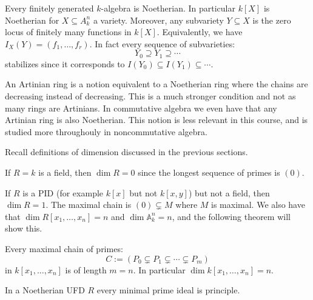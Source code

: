 \documentclass[11pt,a4paper]{article}
\newcommand{\A}{\mathbb A}
\begin{document}
\begin{corollary}
  Every finitely generated $k$-algebra
  is Noetherian.
  In particular $k[X]$ is Noetherian for $X \subseteq A_k^n$
  a variety.
  Moreover, any subvariety $Y \subseteq X$ is the zero locus
  of finitely many functions in $k[X]$.
  Equivalently, we have $I_X(Y) = (f_1,\dots,f_r)$.
  In fact every sequence of subvarieties:
  \[
    Y_0 \supseteq Y_1 \supseteq \cdots
  \]
  stabilizes since it corresponds to
  $I(Y_0) \subseteq I(Y_1) \subseteq \cdots$.
\end{corollary}

\begin{remark}
  An Artinian ring is a notion equivalent to a Noetherian
  ring where the chains are decreasing instead of decreasing.
  This is a much stronger condition and not as many rings are Artinians.
  In commutative algebra we even have that any Artinian ring is also Noetherian.
  This notion is less relevant in this course, and is studied
  more throughouly in noncommutative algebra.
\end{remark}

\begin{remark}
  Recall definitions of dimension discussed in the previous sections.
\end{remark}

\begin{example}
  If $R = k$ is a field, then $\dim R = 0$
  since the longest sequence of primes is $(0)$.
\end{example}

\begin{example}
  If $R$ is a PID (for example $k[x]$ but not $k[x,y]$)
  but not a field, then $\dim R = 1$.
  The maximal chain is $(0) \subsetneq M$ where $M$ is maximal.
  We also have that $\dim R[x_1,\dots,x_n] = n$
  and $\dim \A_k^n = n$,
  and the following theorem will show this.
\end{example}

\begin{theorem}
  \label{thm:dimension}
  Every maximal chain of primes:
  \[
    C := (P_0 \subsetneq P_1 \subsetneq \cdots \subsetneq P_m)
  \]
  in $k[x_1,\dots,x_n]$ is of length $m = n$.
  In particular $\dim k[x_1,\dots,x_n] = n$.
\end{theorem}

\begin{exercise}
  \label{ex:dim-one}
  In a Noetherian UFD $R$ every minimal prime
  ideal is principle.
\end{exercise}
\end{document}
